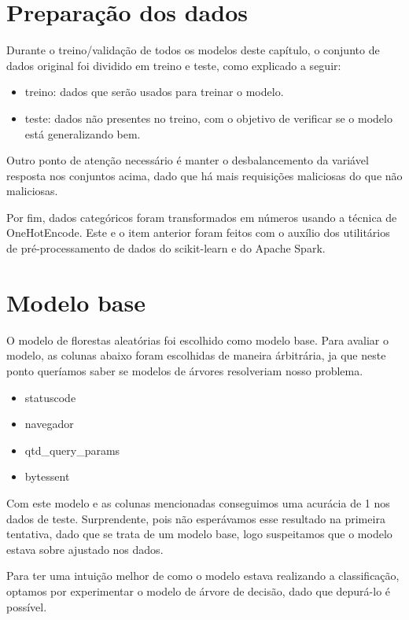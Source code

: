 \section{Preparação dos dados}

Durante o treino/validação de todos os modelos deste capítulo, o conjunto de dados original foi dividido 
em treino e teste, como explicado a seguir:

\begin{itemize}
    \item treino: dados que serão usados para treinar o modelo.
    \item teste: dados não presentes no treino, com o objetivo de verificar se o modelo está generalizando bem.
\end{itemize}

Outro ponto de atenção necessário é manter o desbalancemento da variável resposta nos 
conjuntos acima, dado que há mais requisições maliciosas do que não maliciosas. 

Por fim, dados categóricos foram transformados em números usando a técnica de OneHotEncode. Este e o item
anterior foram feitos com o auxílio dos utilitários de pré-processamento de dados do scikit-learn e do Apache Spark.

\section{Modelo base}

O modelo de florestas aleatórias foi escolhido como modelo base. Para avaliar o modelo, as colunas 
abaixo foram escolhidas de maneira árbitrária, ja que neste ponto queríamos saber se modelos de 
árvores resolveriam nosso problema.

\begin{itemize}
    \item statuscode
    \item navegador
    \item qtd\_query\_params
    \item bytessent
\end{itemize}


Com este modelo e as colunas mencionadas conseguimos uma acurácia de 1 nos dados de teste. Surprendente, pois 
não esperávamos esse resultado na primeira tentativa, dado que se trata de um modelo base, logo suspeitamos 
que o modelo estava sobre ajustado nos dados. 

Para ter uma intuição melhor de como o modelo estava realizando a classificação, optamos por experimentar 
o modelo de árvore de decisão, dado que depurá-lo é possível.

